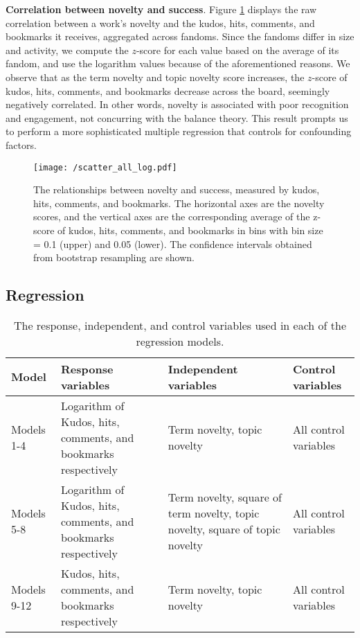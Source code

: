 \documentclass[letterpaper]{article} %
\begin{document}
 

\textbf{Correlation between novelty and success}. Figure \ref{fig:tfidf_lda_kudos} displays the raw correlation between a work's novelty and the kudos, hits, comments, and bookmarks it receives, aggregated across fandoms. Since the fandoms differ in size and activity, we compute the $z$-score for each value based on the average of its fandom, and use the logarithm values because of the aforementioned reasons. We observe that as the term novelty and topic novelty score increases, the $z$-score of kudos, hits, comments, and bookmarks decrease across the board, seemingly negatively correlated. In other words, novelty is associated with poor recognition and engagement, not concurring with the balance theory. This result prompts us to perform a more sophisticated multiple regression that controls for confounding factors.


 \begin{figure}[h]
    \centering
          \texttt{[image: /scatter\_all\_log.pdf]}
        \caption{The relationships between novelty and success, measured by kudos, hits, comments, and bookmarks. The horizontal axes are the novelty scores, and the vertical axes are the corresponding average of the z-score of kudos, hits, comments, and bookmarks in bins with bin size = 0.1 (upper) and 0.05 (lower). The confidence intervals obtained from bootstrap resampling are shown. }
        \label{fig:tfidf_lda_kudos}
\end{figure}

\subsection{Regression}


\begin{table*}
\centering
\begin{tabular}[width=\textwidth]{p{2cm}p{5cm}p{5cm}p{3cm}}
\toprule
Model & Response variables & Independent variables & Control variables \\ 
   \hline
Models 1-4 & Logarithm of Kudos, hits, comments, and bookmarks respectively & Term novelty, topic novelty & All control variables \\
Models 5-8 & Logarithm of Kudos, hits, comments, and bookmarks respectively & Term novelty, square of term novelty, topic novelty, square of topic novelty & All control variables \\
Models 9-12 & Kudos, hits, comments, and bookmarks respectively & Term novelty, topic novelty & All control variables \\

\bottomrule
\end{tabular}
\caption{The response, independent, and control variables used in each of the regression models.}
\label{tab:reg}
\end{table*}%
\end{document}
